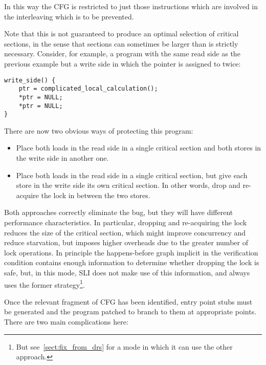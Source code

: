 In this way the CFG is restricted to just those instructions which are
involved in the interleaving which is to be prevented.

Note that this is not guaranteed to produce an optimal selection of
critical sections, in the sense that sections can sometimes be larger
than is strictly necessary.  Consider, for example, a program with the
same read side as the previous example but a write side in which the
pointer is assigned to twice:

\begin{verbatim}
write_side() {
    ptr = complicated_local_calculation();
    *ptr = NULL;
    *ptr = NULL;
}
\end{verbatim}
    
There are now two obvious ways of protecting this program:

\begin{itemize}
\item
  Place both loads in the read side in a single critical section and
  both stores in the write side in another one.
\item
  Place both loads in the read side in a single critical section, but
  give each store in the write side its own critical section.  In
  other words, drop and re-acquire the lock in between the two stores.
\end{itemize}

Both approaches correctly eliminate the bug, but they will have
different performance characteristics.  In particular, dropping and
re-acquiring the lock reduces the size of the critical section, which
might improve concurrency and reduce starvation, but imposes higher
overheads due to the greater number of lock operations.  In principle
the happens-before graph implicit in the verification condition
contains enough information to determine whether dropping the lock is
safe, but, in this mode, SLI does not make use of this information,
and always uses the former strategy\footnote{But
  see~\ref{sect:fix_from_drs} for a mode in which it can use the other
  approach.}.

Once the relevant fragment of CFG has been identified, entry point
stubs must be generated and the program patched to branch to them at
appropriate points.  There are two main complications here:

